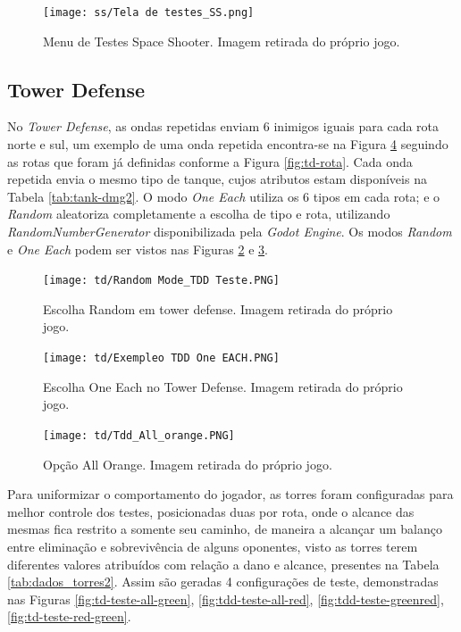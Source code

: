 \begin{figure}
  \centering
  \texttt{[image: ss/Tela de testes\_SS.png]}
  \caption{Menu de Testes Space Shooter. Imagem retirada do próprio jogo.\label{fig:ss-testes}}
\end{figure}

\pagebreak

\subsection{Tower Defense}
\label{sec:mt-td}

No \textit{Tower Defense}, as ondas repetidas enviam 6 inimigos iguais para cada rota norte e sul, um exemplo de uma onda repetida encontra-se na Figura \ref{fig:td-testes-orange} seguindo as rotas que foram já definidas conforme a Figura \ref{fig:td-rota}. Cada onda repetida envia o mesmo tipo de tanque, cujos atributos estam disponíveis na Tabela \ref{tab:tank-dmg2}. O modo \textit{One Each} utiliza os 6 tipos em cada rota; e o \textit{Random} aleatoriza completamente a escolha de tipo e rota, utilizando \textit{RandomNumberGenerator} disponibilizada pela \textit{Godot Engine}. Os modos \textit{Random} e \textit{One Each} podem ser vistos nas Figuras \ref{fig:tdd-testes} e \ref{fig:td-testes-one-each}. 


\begin{figure}
  \centering
  \texttt{[image: td/Random Mode\_TDD Teste.PNG]}
  \caption{Escolha Random em tower defense. Imagem retirada do próprio jogo.\label{fig:tdd-testes}}
\end{figure}


\begin{figure}
  \centering
  \texttt{[image: td/Exempleo TDD One EACH.PNG]}
  \caption{Escolha One Each no Tower Defense. Imagem retirada do próprio jogo.\label{fig:td-testes-one-each}}
\end{figure}


\begin{figure}
  \centering
  \texttt{[image: td/Tdd\_All\_orange.PNG]}
  \caption{Opção All Orange. Imagem retirada do próprio jogo.\label{fig:td-testes-orange}}
\end{figure}

\pagebreak

Para uniformizar o comportamento do jogador, as torres foram configuradas para melhor controle dos testes, posicionadas duas por rota, onde o alcance das mesmas fica restrito a somente seu caminho, de maneira a alcançar um balanço entre eliminação e sobrevivência de alguns oponentes, visto as torres terem diferentes valores atribuídos com relação a dano e alcance, presentes na Tabela \ref{tab:dados_torres2}. Assim são geradas 4 configurações de teste, demonstradas nas Figuras \ref{fig:td-teste-all-green}, \ref{fig:tdd-teste-all-red}, \ref{fig:tdd-teste-greenred}, \ref{fig:td-teste-red-green}.

